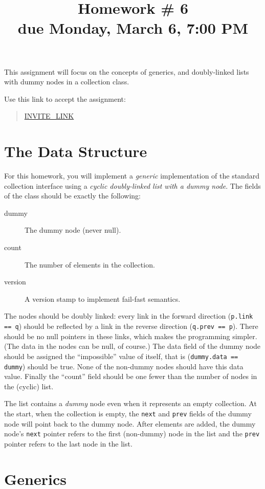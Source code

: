 \documentclass[10pt]{article}
\title[Homework \#6]{Homework \# 6 \\ 
\textbf{due Monday, March 6, 7:00 PM }}
\begin{document}
\maketitle

This assignment will focus on the concepts of generics,
and doubly-linked lists with dummy nodes in a collection class.

Use this link to accept the assignment:
\begin{quote}
\url{INVITE_LINK}
\end{quote}

\section{The Data Structure}

For this homework, you will implement a \emph{generic} implementation of
the standard collection interface using a \emph{cyclic doubly-linked
list with a dummy node}.  The fields of the class should be exactly
the following:
\begin{description}
\item[dummy] The dummy node (never null).
\item[count] The number of elements in the collection.
\item[version] A version stamp to implement fail-fast semantics.
\end{description}
The nodes should be doubly linked: every link in the forward direction
(\texttt{p.link == q}) should be reflected by a link in the reverse
direction (\texttt{q.prev == p}).  There should be no null pointers in
these links, which makes the programming simpler.
(The data in the nodes can be null, of course.)
The data field of the dummy node should be assigned the ``impossible''
value of itself, that is (\texttt{dummy.data == dummy}) should be
true.  None of the non-dummy nodes should have this data value.
Finally the ``count'' field should be one fewer than the number of
nodes in the (cyclic) list.

The list contains a \emph{dummy} node even when it represents an empty
collection.  
At the start, when the collection is empty, the \verb|next| and \verb|prev|
fields of the dummy node will point back to the dummy node.  After elements are
added, the dummy node's \verb|next| pointer refers to the first (non-dummy) node in the list
and the \verb|prev| pointer refers to the last node in the list.

\section{Generics}
\end{document}
